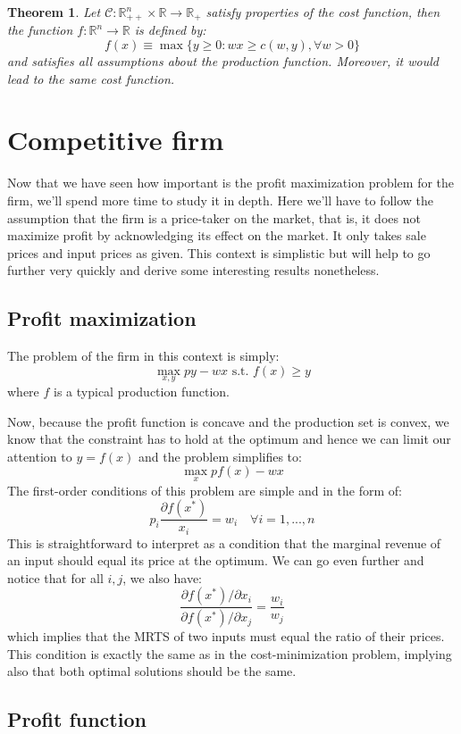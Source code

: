 \documentclass[12pt]{report}
\newtheorem{theorem}{Theorem}[chapter]
\begin{document}
\begin{theorem}
Let $\mathcal{C}:\mathbb{R}_{++}^{n}\times \mathbb{R}\to \mathbb{R}_+$ satisfy properties of the cost function, then the function $f:\mathbb{R}^{n}\to \mathbb{R}$ is defined by: $$ f(x) \equiv \max\{ y\geq 0 : wx \geq c(w,y), \forall w > 0\} $$ and satisfies all assumptions about the production function. Moreover, it would lead to the same cost function.
\end{theorem}

\section{Competitive firm}

Now that we have seen how important is the profit maximization problem for the firm, we'll spend more time to study it in depth. Here we'll have to follow the assumption that the firm is a price-taker on the market, that is, it does not maximize profit by acknowledging its effect on the market. It only takes sale prices and input prices as given. This context is simplistic but will help to go further very quickly and derive some interesting results nonetheless.

\subsection{Profit maximization}

The problem of the firm in this context is simply: $$\max_{x,y} py - wx \text{ s.t. } f(x)\geq y $$ where $f$ is a typical production function.

Now, because the profit function is concave and the production set is convex, we know that the constraint has to hold at the optimum and hence we can limit our attention to $y=f(x)$ and the problem simplifies to: $$\max_{x} pf(x) - wx $$ The first-order conditions of this problem are simple and in the form of: $$p_i \frac{\partial f(x^*)}{x_i} = w_i \quad \forall i = 1, ..., n$$ This is straightforward to interpret as a condition that the marginal revenue of an input should equal its price at the optimum. We can go even further and notice that for all $i,j$, we also have: $$\frac{\partial f(x^*)/\partial x_i}{\partial f(x^*)/\partial x_j} = \frac{w_i}{w_j} $$ which implies that the MRTS of two inputs must equal the ratio of their prices. This condition is exactly the same as in the cost-minimization problem, implying also that both optimal solutions should be the same.

\subsection{Profit function}
\end{document}
